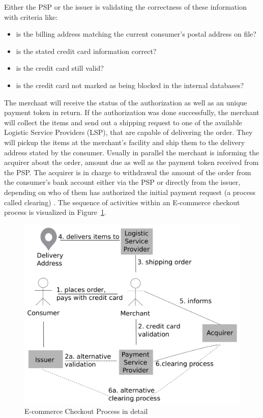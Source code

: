 Either the \gls{PSP} or the issuer is validating the correctness of these information with criteria like: \@

\begin{itemize}
    \item is the billing address matching the current consumer's postal address on file?
    \item is the stated credit card information correct?
    \item is the credit card still valid?
    \item is the credit card not marked as being blocked in the internal databases?
\end{itemize}

The merchant will receive the status of the authorization as well as an unique payment token in return. If the authorization was done successfully, the merchant will collect the items and send out a shipping request to one of the available Logistic Service Providers (\gls{LSP}), that are capable of delivering the order. They will pickup the items at the merchant's facility and ship them to the delivery address stated by the consumer. Usually in parallel the merchant is informing the acquirer about the order, amount due as well as the payment token received from the \gls{PSP}. The acquirer is in charge to withdrawal the amount of the order from the consumer's bank account either via the \gls{PSP} or directly from the issuer, depending on who of them has authorized the initial payment request (a process called clearing) \citep{VisaPayment2014}. The sequence of activities within an \gls{E-commerce} checkout process is visualized in Figure~\ref{fig:images_ecommerce_checkout_process}.\@

\begin{figure}[!ht]
	\centering
		\includegraphics[width=0.9\columnwidth]{images/e-commerce-checkout-process.pdf}
	\caption{\gls{E-commerce} Checkout Process in detail}
\label{fig:images_ecommerce_checkout_process}
\end{figure}

